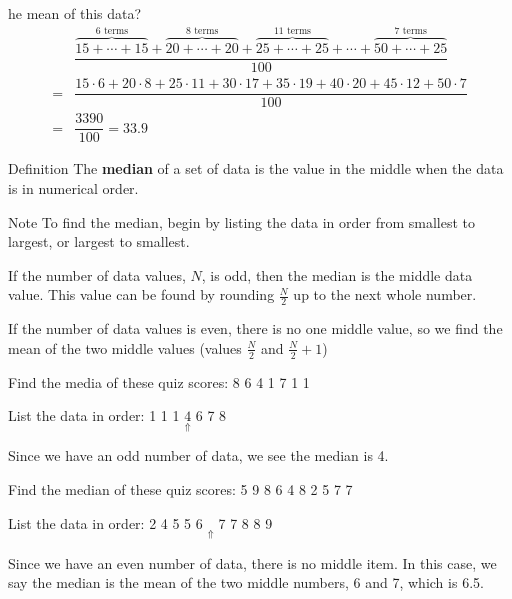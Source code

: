 \documentclass{beamer}
\begin{document}
\begin{frame}
\begin{example}
he mean of this data?\pause
\begin{equation*}
\begin{aligned}
&\dfrac{\overbrace{15+\cdots+15}^{\text{6 terms}}+\overbrace{20+\cdots+20}^{\text{8 terms}}+\overbrace{25+\cdots+25}^{\text{11 terms}}+\cdots+\overbrace{50+\cdots+25}^{\text{7 terms}}}{100} \\
=&\dfrac{15\cdot 6+20\cdot 8+25\cdot 11+30\cdot 17+35\cdot 19+40\cdot 20+45\cdot 12+50\cdot 7}{100} \\
=& \dfrac{3390}{100} = 33.9
\end{aligned}
\end{equation*}
\end{example}
\end{frame}

\begin{frame}
\begin{block}{Definition}
The \textbf{median} of a set of data is the value in the middle when the data is in numerical order.
\end{block}\pause

\begin{block}{Note}
To find the median, begin by listing the data in order from smallest to largest, or largest to smallest.

\vspace{2mm}
If the number of data values, $N$, is odd, then the median is the middle data value. This value can be found by rounding $\frac{N}{2}$ up to the next whole number.

\vspace{2mm}
If the number of data values is even, there is no one middle value, so we find the mean
of the two middle values (values $\frac{N}{2}$ and $\frac{N}{2} + 1$)
\end{block}
\end{frame}

\begin{frame}
\begin{example}
Find the media of these quiz scores: 8 6 4 1 7 1 1\pause

\vspace{2mm}
List the data in order: 1 1 1 $\underset{\Uparrow}{4}$ 6 7 8

\vspace{2mm}
Since we have an odd number of data, we see the median is 4.
\end{example}\pause

\begin{example}
Find the median of these quiz scores: 5 9 8 6 4 8 2 5 7 7\pause

\vspace{2mm}
List the data in order: 2 4 5 5 6 $\underset{\Uparrow}{}$ 7 7 8 8 9

\vspace{2mm}
Since we have an even number of data, there is no middle item. In this case, we say the median is the mean of the two middle numbers, 6 and 7, which is 6.5.
\end{example}
\end{frame}
\end{document}
